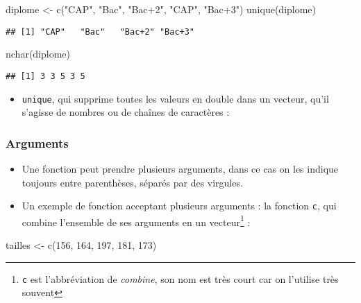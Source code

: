 \documentclass[
]{article}
\newenvironment{Shaded}{\begin{snugshade}}{\end{snugshade}}
\newcommand{\DecValTok}[1]{\textcolor[rgb]{0.00,0.00,0.81}{#1}}
\newcommand{\FunctionTok}[1]{\textcolor[rgb]{0.00,0.00,0.00}{#1}}
\newcommand{\NormalTok}[1]{#1}
\newcommand{\OtherTok}[1]{\textcolor[rgb]{0.56,0.35,0.01}{#1}}
\newcommand{\StringTok}[1]{\textcolor[rgb]{0.31,0.60,0.02}{#1}}
\providecommand{\tightlist}{%
  \setlength{\itemsep}{0pt}\setlength{\parskip}{0pt}}
\begin{document}
\begin{Shaded}
\begin{Highlighting}[]
\NormalTok{diplome }\OtherTok{\textless{}{-}} \FunctionTok{c}\NormalTok{(}\StringTok{"CAP"}\NormalTok{, }\StringTok{"Bac"}\NormalTok{, }\StringTok{"Bac+2"}\NormalTok{, }\StringTok{"CAP"}\NormalTok{, }\StringTok{"Bac+3"}\NormalTok{)}
\FunctionTok{unique}\NormalTok{(diplome)}
\end{Highlighting}
\end{Shaded}

\begin{verbatim}
## [1] "CAP"   "Bac"   "Bac+2" "Bac+3"
\end{verbatim}

\begin{Shaded}
\begin{Highlighting}[]
\FunctionTok{nchar}\NormalTok{(diplome)}
\end{Highlighting}
\end{Shaded}

\begin{verbatim}
## [1] 3 3 5 3 5
\end{verbatim}

\begin{itemize}
\tightlist
\item
  \texttt{unique}, qui supprime toutes les valeurs en double dans un
  vecteur, qu'il s'agisse de nombres ou de chaînes de caractères :
\end{itemize}

\hypertarget{arguments}{%
\subsubsection{Arguments}\label{arguments}}

\begin{itemize}
\item
  Une fonction peut prendre plusieurs arguments, dans ce cas on les
  indique toujours entre parenthèses, séparés par des virgules.
\item
  Un exemple de fonction acceptant plusieurs arguments : la fonction
  \texttt{c}, qui combine l'ensemble de ses arguments en un
  vecteur\footnote{\texttt{c} est l'abbréviation de \emph{combine}, son
    nom est très court car on l'utilise très souvent} :
\end{itemize}

\begin{Shaded}
\begin{Highlighting}[]
\NormalTok{tailles }\OtherTok{\textless{}{-}} \FunctionTok{c}\NormalTok{(}\DecValTok{156}\NormalTok{, }\DecValTok{164}\NormalTok{, }\DecValTok{197}\NormalTok{, }\DecValTok{181}\NormalTok{, }\DecValTok{173}\NormalTok{)}
\end{Highlighting}
\end{Shaded}
\end{document}
